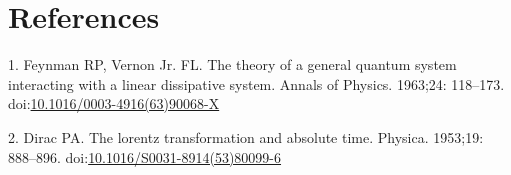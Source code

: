 \documentclass[10pt,letterpaper]{article}
\begin{document}
\hypertarget{references}{%
\section*{References}\label{references}}

\hypertarget{refs}{}
\leavevmode\hypertarget{ref-Feynman1963118}{}%
1. Feynman RP, Vernon Jr. FL. The theory of a general quantum system
interacting with a linear dissipative system. Annals of Physics.
1963;24: 118--173.
doi:\href{https://doi.org/10.1016/0003-4916(63)90068-X}{10.1016/0003-4916(63)90068-X}

\leavevmode\hypertarget{ref-Dirac1953888}{}%
2. Dirac PA. The lorentz transformation and absolute time. Physica.
1953;19: 888--896.
doi:\href{https://doi.org/10.1016/S0031-8914(53)80099-6}{10.1016/S0031-8914(53)80099-6}

\nolinenumbers
\end{document}
